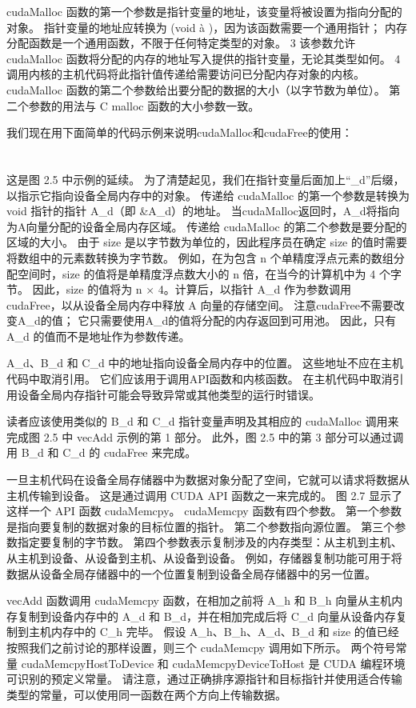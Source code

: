 cudaMalloc 函数的第一个参数是指针变量的地址，该变量将被设置为指向分配的对象。 指针变量的地址应转换为 (void à )，因为该函数需要一个通用指针； 内存分配函数是一个通用函数，不限于任何特定类型的对象。 3 该参数允许 cudaMalloc 函数将分配的内存的地址写入提供的指针变量，无论其类型如何。 4 调用内核的主机代码将此指针值传递给需要访问已分配内存对象的内核。 cudaMalloc 函数的第二个参数给出要分配的数据的大小（以字节数为单位）。 第二个参数的用法与 C malloc 函数的大小参数一致。

我们现在用下面简单的代码示例来说明cudaMalloc和cudaFree的使用：
\\
\\
\\
这是图 2.5 中示例的延续。 为了清楚起见，我们在指针变量后面加上“\_d”后缀，以指示它指向设备全局内存中的对象。 传递给 cudaMalloc 的第一个参数是转换为 void 指针的指针 A\_d（即 \&A\_d）的地址。 当cudaMalloc返回时，A\_d将指向为A向量分配的设备全局内存区域。 传递给 cudaMalloc 的第二个参数是要分配的区域的大小。 由于 size 是以字节数为单位的，因此程序员在确定 size 的值时需要将数组中的元素数转换为字节数。 例如，在为包含 n 个单精度浮点元素的数组分配空间时，size 的值将是单精度浮点数大小的 n 倍，在当今的计算机中为 4 个字节。 因此，size 的值将为 n × 4。计算后，以指针 A\_d 作为参数调用 cudaFree，以从设备全局内存中释放 A 向量的存储空间。 注意cudaFree不需要改变A\_d的值； 它只需要使用A\_d的值将分配的内存返回到可用池。 因此，只有 A\_d 的值而不是地址作为参数传递。

A\_d、B\_d 和 C\_d 中的地址指向设备全局内存中的位置。 这些地址不应在主机代码中取消引用。 它们应该用于调用API函数和内核函数。 在主机代码中取消引用设备全局内存指针可能会导致异常或其他类型的运行时错误。

读者应该使用类似的 B\_d 和 C\_d 指针变量声明及其相应的 cudaMalloc 调用来完成图 2.5 中 vecAdd 示例的第 1 部分。 此外，图 2.5 中的第 3 部分可以通过调用 B\_d 和 C\_d 的 cudaFree 来完成。

一旦主机代码在设备全局存储器中为数据对象分配了空间，它就可以请求将数据从主机传输到设备。 这是通过调用 CUDA API 函数之一来完成的。 图 2.7 显示了这样一个 API 函数 cudaMemcpy。 cudaMemcpy 函数有四个参数。 第一个参数是指向要复制的数据对象的目标位置的指针。 第二个参数指向源位置。 第三个参数指定要复制的字节数。 第四个参数表示复制涉及的内存类型：从主机到主机、从主机到设备、从设备到主机、从设备到设备。 例如，存储器复制功能可用于将数据从设备全局存储器中的一个位置复制到设备全局存储器中的另一位置。

vecAdd 函数调用 cudaMemcpy 函数，在相加之前将 A\_h 和 B\_h 向量从主机内存复制到设备内存中的 A\_d 和 B\_d，并在相加完成后将 C\_d 向量从设备内存复制到主机内存中的 C\_h 完毕。 假设 A\_h、B\_h、A\_d、B\_d 和 size 的值已经按照我们之前讨论的那样设置，则三个 cudaMemcpy 调用如下所示。 两个符号常量 cudaMemcpyHostToDevice 和 cudaMemcpyDeviceToHost 是 CUDA 编程环境可识别的预定义常量。 请注意，通过正确排序源指针和目标指针并使用适合传输类型的常量，可以使用同一函数在两个方向上传输数据。
\\
\\
\\

